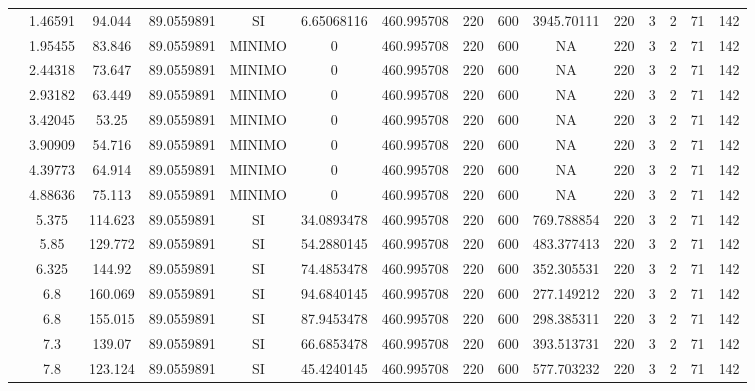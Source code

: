 \begin{table}[H]
{\begin{tabular}{|c|c|c|c|c|c|c|c|c|c|c|c|c|c|c|}
\cline{2-15}    & 1.46591 & 94.044 & 89.0559891 & SI  & 6.65068116 & 460.995708 & 220 & 600 & 3945.70111 & 220 & 3   & 2   & 71  & 142 \bigstrut\\
\cline{2-15}    & 1.95455 & 83.846 & 89.0559891 & MINIMO & 0   & 460.995708 & 220 & 600 & NA  & 220 & 3   & 2   & 71  & 142 \bigstrut\\
\cline{2-15}    & 2.44318 & 73.647 & 89.0559891 & MINIMO & 0   & 460.995708 & 220 & 600 & NA  & 220 & 3   & 2   & 71  & 142 \bigstrut\\
\cline{2-15}    & 2.93182 & 63.449 & 89.0559891 & MINIMO & 0   & 460.995708 & 220 & 600 & NA  & 220 & 3   & 2   & 71  & 142 \bigstrut\\
\cline{2-15}    & 3.42045 & 53.25 & 89.0559891 & MINIMO & 0   & 460.995708 & 220 & 600 & NA  & 220 & 3   & 2   & 71  & 142 \bigstrut\\
\cline{2-15}    & 3.90909 & 54.716 & 89.0559891 & MINIMO & 0   & 460.995708 & 220 & 600 & NA  & 220 & 3   & 2   & 71  & 142 \bigstrut\\
\cline{2-15}    & 4.39773 & 64.914 & 89.0559891 & MINIMO & 0   & 460.995708 & 220 & 600 & NA  & 220 & 3   & 2   & 71  & 142 \bigstrut\\
\cline{2-15}    & 4.88636 & 75.113 & 89.0559891 & MINIMO & 0   & 460.995708 & 220 & 600 & NA  & 220 & 3   & 2   & 71  & 142 \bigstrut\\
\cline{2-15}    & 5.375 & 114.623 & 89.0559891 & SI  & 34.0893478 & 460.995708 & 220 & 600 & 769.788854 & 220 & 3   & 2   & 71  & 142 \bigstrut\\
\cline{2-15}    & 5.85 & 129.772 & 89.0559891 & SI  & 54.2880145 & 460.995708 & 220 & 600 & 483.377413 & 220 & 3   & 2   & 71  & 142 \bigstrut\\
\cline{2-15}    & 6.325 & 144.92 & 89.0559891 & SI  & 74.4853478 & 460.995708 & 220 & 600 & 352.305531 & 220 & 3   & 2   & 71  & 142 \bigstrut\\
\cline{2-15}    & 6.8 & 160.069 & 89.0559891 & SI  & 94.6840145 & 460.995708 & 220 & 600 & 277.149212 & 220 & 3   & 2   & 71  & 142 \bigstrut\\
\cline{2-15}    & 6.8 & 155.015 & 89.0559891 & SI  & 87.9453478 & 460.995708 & 220 & 600 & 298.385311 & 220 & 3   & 2   & 71  & 142 \bigstrut\\
\cline{2-15}    & 7.3 & 139.07 & 89.0559891 & SI  & 66.6853478 & 460.995708 & 220 & 600 & 393.513731 & 220 & 3   & 2   & 71  & 142 \bigstrut\\
\cline{2-15}    & 7.8 & 123.124 & 89.0559891 & SI  & 45.4240145 & 460.995708 & 220 & 600 & 577.703232 & 220 & 3   & 2   & 71  & 142 \bigstrut\\

\end{tabular}}
\end{table}
